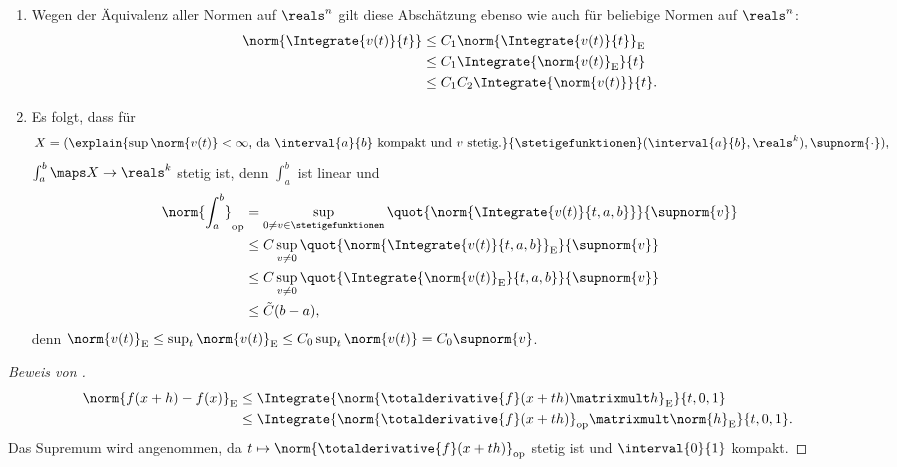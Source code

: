 \begin{bemerkungen*}
    \begin{enumerate}
        \item Wegen der Äquivalenz aller Normen auf \( \reals^n \) gilt diese Abschätzung ebenso wie  auch für beliebige Normen auf \( \reals^n \):
        \begin{equation*}
            \begin{split}
                \norm{\Integrate{v(t)}{t}}&\leq C_1\norm{\Integrate{v(t)}{t}}_{\text{E}}\\
                &\leq C_1\Integrate{\norm{v(t)}_{\text{E}}}{t}\\
                &\leq C_1 C_2 \Integrate{\norm{v(t)}}{t}.
            \end{split}
        \end{equation*}
        \item Es folgt, dass für
        \begin{equation*}
            X=(\explain{\sup\norm{v(t)}<\infty \text{, da \( \interval{a}{b} \) kompakt und \( v \) stetig.}}{\stetigefunktionen}(\interval{a}{b},\reals^k),\supnorm{\cdot}),
        \end{equation*}
        \( \int_a^b\maps X\to \reals^k \) stetig ist, denn \( \int_a^b \) ist linear und
        \begin{equation*}
            \begin{split}
                \norm{\int_a^b}_{\text{op}}&=\sup_{0\neq v \in \stetigefunktionen}\quot{\norm{\Integrate{v(t)}{t,a,b}}}{\supnorm{v}}\\
                &\leq C\sup_{v\neq 0}\quot{\norm{\Integrate{v(t)}{t,a,b}}_{\text{E}}}{\supnorm{v}}\\
                &\leq C\sup_{v\neq 0}\quot{\Integrate{\norm{v(t)}_{\text{E}}}{t,a,b}}{\supnorm{v}}\\
                &\leq \tilde{C}(b-a),
            \end{split}
        \end{equation*}
        denn \( \norm{v(t)}_{\text{E}}\leq \sup_{t}\norm{v(t)}_\text{E}\leq C_0\sup_t\norm{v(t)}=C_0\supnorm{v} \).
    \end{enumerate}
\end{bemerkungen*}
\begin{proof}[Beweis von ]
    \begin{equation*}
        \begin{split}
            \norm{f(x+h)-f(x)}_{\text{E}}&\leq \Integrate{\norm{\totalderivative{f}(x+th)\matrixmult h}_{\text{E}}}{t,0,1}\\
            &\leq \Integrate{\norm{\totalderivative{f}(x+th)}_{\text{op}}\matrixmult \norm{h}_{\text{E}}}{t,0,1}.
        \end{split}
    \end{equation*}
    Das Supremum wird angenommen, da \( t\mapsto \norm{\totalderivative{f}(x+th)}_{\text{op}} \) stetig ist und \( \interval{0}{1} \) kompakt.
\end{proof}
